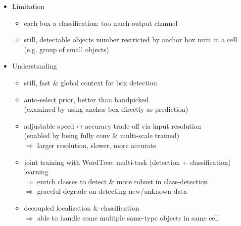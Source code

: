 \begin{itemize}
\begin{itemize}
	\item Limitation
		\begin{itemize}
		\item each box a classification: too much output channel
		\item still, detectable objects number restricted by anchor box num in a cell \\
		(e.g. group of small objects)
		\end{itemize}
	\item Understanding
		\begin{itemize}
		\item still, fast \& global context for box detection
		\item auto-select prior, better than handpicked \\
		(examined by using anchor box directly as prediction)
		\item adjustable speed$\leftrightarrow$accuracy trade-off via input resolution \\
		(enabled by being fully conv \& multi-scale trained) \\
		$\Rightarrow$ larger resolution, slower, more accurate
		\item joint training with WordTree: multi-task (detection + classification) learning \\
		$\Rightarrow$ enrich classes to detect \& more robust in class-detection \\
		$\Rightarrow$ graceful degrade on detecting new/unknown data
		\item decoupled localization \& classification \\
		$\Rightarrow$ able to handle some multiple same-type objects in same cell
		\end{itemize}
	\end{itemize}


\end{itemize}
